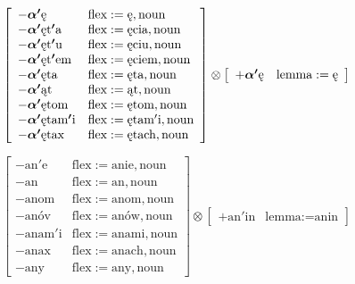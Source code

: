 \documentclass{article}
\begin{document}
\begin{scriptsize}\[
\left[\begin{array}{ll}
-\text{\boldmath$\alpha'$ę} & \text{flex}:=\text{ę}, \text{noun}\\
-\text{\boldmath$\alpha'$ęt$'$a} & \text{flex}:=\text{ęcia}, \text{noun}\\
-\text{\boldmath$\alpha'$ęt$'$u} & \text{flex}:=\text{ęciu}, \text{noun}\\
-\text{\boldmath$\alpha'$ęt$'$em} & \text{flex}:=\text{ęciem}, \text{noun}\\
-\text{\boldmath$\alpha'$ęta} & \text{flex}:=\text{ęta}, \text{noun}\\
-\text{\boldmath$\alpha'$ąt} & \text{flex}:=\text{ąt}, \text{noun}\\
-\text{\boldmath$\alpha'$ętom} & \text{flex}:=\text{ętom}, \text{noun}\\
-\text{\boldmath$\alpha'$ętam$'$i} & \text{flex}:=\text{ętam$'$i}, \text{noun}\\
-\text{\boldmath$\alpha'$ętax} & \text{flex}:=\text{ętach}, \text{noun}
\end{array}\right] \otimes \left[\begin{array}{ll}
+\text{\boldmath$\alpha'$ę} & \text{lemma}:=\text{ę}
\end{array}\right]
\]\end{scriptsize}

\begin{scriptsize}\[
\left[\begin{array}{ll}
-\text{an$'$e} & \text{flex}:=\text{anie}, \text{noun}\\
-\text{an} & \text{flex}:=\text{an}, \text{noun}\\
-\text{anom} & \text{flex}:=\text{anom}, \text{noun}\\
-\text{anóv} & \text{flex}:=\text{anów}, \text{noun}\\
-\text{anam$'$i} & \text{flex}:=\text{anami}, \text{noun}\\
-\text{anax} & \text{flex}:=\text{anach}, \text{noun}\\
-\text{any} & \text{flex}:=\text{any}, \text{noun}
\end{array}\right] \otimes \left[\begin{array}{ll}
+\text{an$'$in} & \text{lemma}:=\text{anin}
\end{array}\right]
\]\end{scriptsize}
\end{document}
